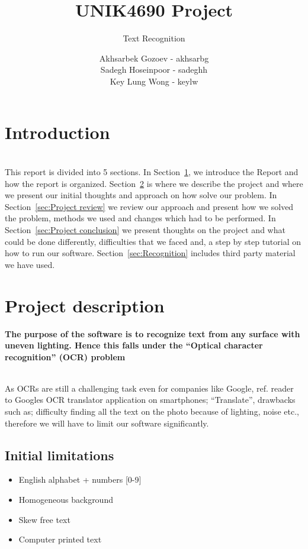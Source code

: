 \documentclass[11pt,a4paper,UKenglish]{article}
\title{UNIK4690 Project}
\subtitle{Text Recognition}
\author{
  Akhsarbek Gozoev  - akhsarbg \\
  Sadegh Hoseinpoor - sadeghh\\
  Key Lung Wong - keylw
}
\begin{document}
\ififorside[kind={Report}]

\newpage
\tableofcontents
\newpage
\section{Introduction}
\label{sec:Introduction}
\noindent \\ This report is divided into 5 sections. In Section~\ref{sec:Introduction}, we introduce the
Report and how the report is organized. Section~\ref{sec:Project description} is
where we describe the project and where we present our initial thoughts and
approach on how solve our problem. In Section~\ref{sec:Project review} we
review our approach and present how we solved the problem, methods we used and
changes which had to be performed. In Section~\ref{sec:Project conclusion} we
present thoughts on the project and what could be done differently,
difficulties that we faced and, a step by step tutorial on how to run our
software. Section~\ref{sec:Recognition} includes third party material we have used.


\newpage

\section{Project description}
\label{sec:Project description}
\textbf{The purpose of the software is to recognize text from any
surface with uneven lighting. Hence this falls under the ``Optical
character recognition'' (OCR) problem}

\noindent \\ As OCRs are still a challenging task even for companies like
Google, ref. reader to Googles OCR translator application on smartphones;
``Translate'', drawbacks such as; difficulty finding all the text on the photo
because of lighting, noise etc., therefore we will have to limit our software
significantly.


\subsection{Initial limitations}
\begin{itemize}
 \item{English alphabet + numbers [0-9]}
 \item{Homogeneous background}
 \item{Skew free text}
 \item{Computer printed text}
\end{itemize}
\end{document}
